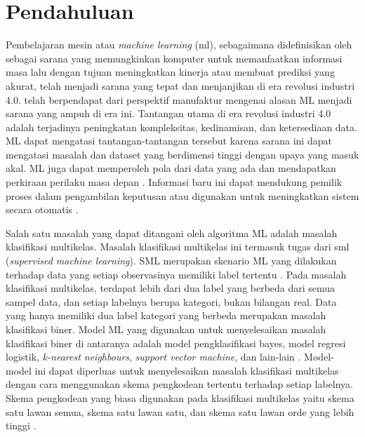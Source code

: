 \vspace{15cm}
\chapter{Pendahuluan} \label{bab satu}

\noindent Pembelajaran mesin atau \emph{machine learning} (\gls{ml}), sebagaimana didefinisikan oleh  sebagai sarana yang memungkinkan komputer untuk memanfaatkan informasi masa lalu dengan tujuan meningkatkan kinerja atau membuat prediksi yang akurat, telah menjadi sarana yang tepat dan menjanjikan di era revolusi industri 4.0.  telah berpendapat dari perspektif manufaktur mengenai alasan ML menjadi sarana yang ampuh di era ini. Tantangan utama di era revolusi industri 4.0 adalah terjadinya peningkatan kompleksitas, kedinamisan, dan ketersediaan data. ML dapat mengatasi tantangan-tantangan tersebut karena sarana ini dapat mengatasi masalah dan dataset yang berdimensi tinggi dengan upaya yang masuk akal. ML juga dapat memperoleh pola dari data yang ada dan mendapatkan perkiraan perilaku masa depan \cite{adin}. Informasi baru ini dapat mendukung pemilik proses dalam pengambilan keputusan atau digunakan untuk meningkatkan sistem secara otomatis \cite{wuest}.

\noindent Salah satu masalah yang dapat ditangani oleh algoritma ML adalah masalah klasifikasi multikelas. Masalah klasifikasi multikelas ini termasuk tugas dari \gls{sml} (\emph{supervised machine learning}). SML merupakan skenario ML yang dilakukan terhadap data yang setiap observasinya memiliki label tertentu \cite{mohri}. Pada masalah klasifikasi multikelas, terdapat lebih dari dua label yang berbeda dari semua sampel data, dan setiap labelnya berupa kategori, bukan bilangan real. Data yang hanya memiliki dua label kategori yang berbeda merupakan masalah klasifikasi biner. Model ML yang digunakan untuk menyelesaikan masalah klasifikasi biner di antaranya adalah model pengklasifikasi bayes, model regresi logistik, \emph{k-nearest neighbours}, \emph{support vector machine}, dan lain-lain \cite{rogers}. Model-model ini dapat diperluas untuk menyelesaikan masalah klasifikasi multikelas dengan cara menggunakan skema pengkodean tertentu terhadap setiap labelnya. Skema pengkodean yang biasa digunakan pada klasifikasi multikelas yaitu skema satu lawan semua, skema satu lawan satu, dan skema satu lawan orde yang lebih tinggi \cite{ou}.

